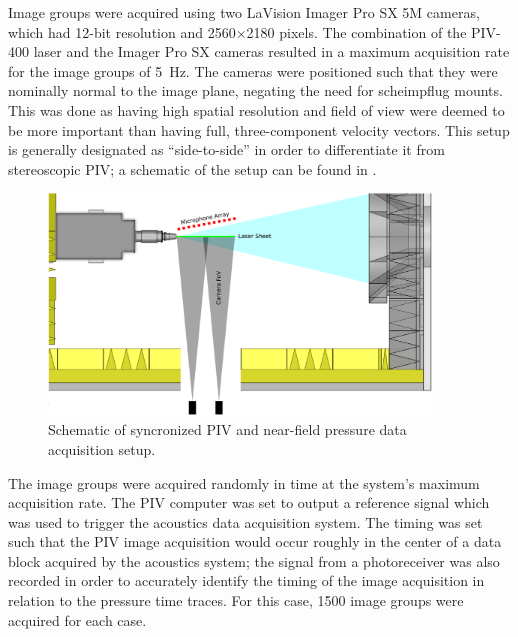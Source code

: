 Image groups were acquired using two LaVision Imager Pro SX 5M cameras, which had 12-bit resolution and 2560$\times$2180 pixels.
The combination of the PIV-400 laser and the Imager Pro SX cameras resulted in a maximum acquisition rate for the image groups of 5~Hz.
The cameras were positioned such that they were nominally normal to the image plane, negating the need for scheimpflug mounts.
This was done as having high spatial resolution and field of view were deemed to be more important than having full, three-component velocity vectors.
This setup is generally designated as ``side-to-side'' in order to differentiate it from stereoscopic PIV; a schematic of the setup can be found in .
\begin{figure}
	\centering
	\includegraphics[width=4in]{Figures/ch2_piv_setup.eps}
	\caption{Schematic of syncronized PIV and near-field pressure data acquisition setup.}
	\label{fig:piv_setup}
\end{figure}

The image groups were acquired randomly in time at the system's maximum acquisition rate.
The PIV computer was set to output a reference signal which was used to trigger the acoustics data acquisition system.
The timing was set such that the PIV image acquisition would occur roughly in the center of a data block acquired by the acoustics system; the signal from a photoreceiver was also recorded in order to accurately identify the timing of the image acquisition in relation to the pressure time traces.
For this case, 1500 image groups were acquired for each case.